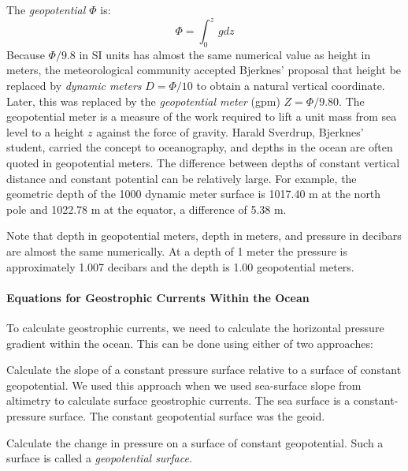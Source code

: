The \textit{geopotential $\Phi$} is:
\begin{equation}
\Phi =\int_0^z\,g dz
\end{equation}
Because $\Phi/9.8$ in SI units has almost the same numerical value as
height in meters, the meteorological community accepted Bjerknes'
proposal that height be replaced by \textit{dynamic
  meters} $D = \Phi/10$ to obtain a
natural vertical coordinate. Later, this was replaced by the
\textit{geopotential meter} (gpm) $Z
= \Phi/9.80$. The geopotential meter is a measure of the work required
to lift a unit mass from sea level to a height $z$ against the force
of gravity. Harald Sverdrup, Bjerknes' student, carried the concept to
oceanography, and depths in the ocean are often quoted in geopotential
meters. The difference between depths of constant vertical distance
and constant potential can be relatively large. For example, the
geometric depth of the 1000 dynamic meter surface is 1017.40 m at the
north pole and 1022.78 m at the equator, a difference of 5.38 m.

Note that depth in geopotential meters, depth in meters, and pressure
in decibars are almost the same numerically. At a depth of 1 meter the
pressure is approximately 1.007 decibars and the depth is 1.00
geopotential meters.

\paragraph{Equations for Geostrophic Currents Within the Ocean}
To calculate geo\-strophic
currents, we need to calculate the horizontal pressure gradient
with\-in the ocean. This can be done using either of two approaches:
\begin{enumerate}
\vitem Calculate the slope of a constant pressure surface relative to
a surface of constant geopotential. We used this approach when we used
sea-surface slope from altimetry to calculate surface geostrophic
currents. The sea surface is a constant-pressure surface. The constant
geopotential surface was the geoid.

\vitem Calculate the change in pressure on a surface of constant
geopotential. Such a surface is called a \textit{geopotential
  surface}.
\end{enumerate}

